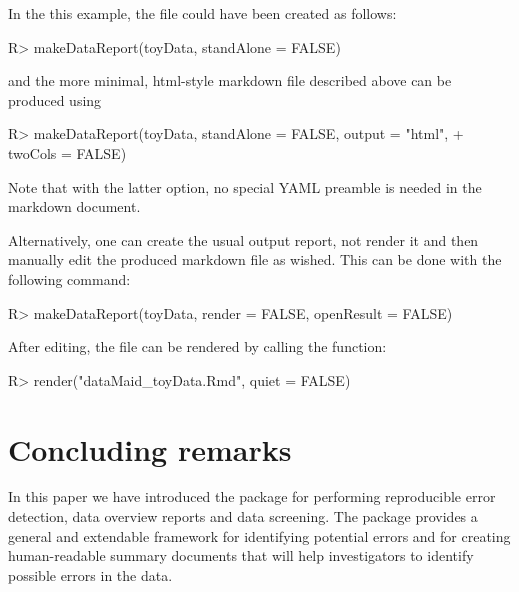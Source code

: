 \documentclass[article,shortnames]{jss}
\begin{document}
In the this example, the  file could have
been created as follows:

\begin{Schunk}
\begin{Sinput}
R> makeDataReport(toyData, standAlone = FALSE)
\end{Sinput}
\end{Schunk}

and the more minimal, html-style  markdown file described above can be produced using

\begin{Schunk}
\begin{Sinput}
R> makeDataReport(toyData, standAlone = FALSE, output = "html", 
+    twoCols = FALSE)
\end{Sinput}
\end{Schunk}

Note that with the latter option, no special YAML preamble is needed in the  markdown document. 

Alternatively, one can create the usual output report, not render it and then manually edit the produced  markdown file as wished. This can be done with the following command:

\begin{Schunk}
\begin{Sinput}
R> makeDataReport(toyData, render = FALSE, openResult = FALSE)
\end{Sinput}
\end{Schunk}

After editing, the file can be rendered by calling the  function:

\begin{Schunk}
\begin{Sinput}
R> render("dataMaid_toyData.Rmd", quiet = FALSE)
\end{Sinput}
\end{Schunk}


\section{Concluding remarks}
\label{conclusion}

In this paper we have introduced the  package
 for performing reproducible error detection, data
overview reports and data screening. The package provides a general and
extendable framework for identifying potential errors and for creating
human-readable summary documents that will help investigators to
identify possible errors in the data.
\end{document}
